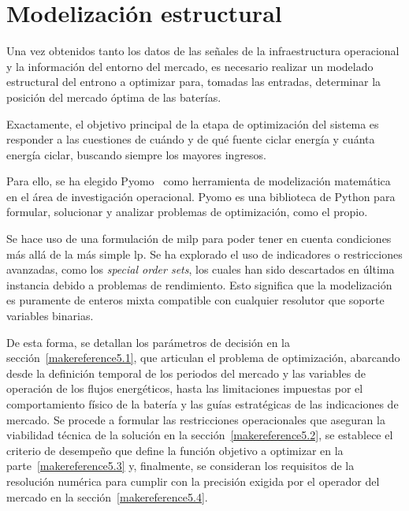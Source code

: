 
\cleardoublepage%

\chapter{Modelización estructural}%
\label{makereference5}

Una vez obtenidos tanto los datos de las señales de la infraestructura operacional y la información del entorno del mercado, es necesario realizar un modelado estructural del entrono a optimizar para, tomadas las entradas, determinar la posición del mercado óptima de las baterías.

Exactamente, el objetivo principal de la etapa de optimización del sistema es responder a las cuestiones de cuándo y de qué fuente ciclar energía y cuánta energía ciclar, buscando siempre los mayores ingresos.

Para ello, se ha elegido Pyomo~\cite{pyomo2025optimization} como herramienta de modelización matemática en el área de investigación operacional. Pyomo es una biblioteca de Python para formular, solucionar y analizar problemas de optimización, como el propio.

Se hace uso de una formulación de \gls{milp} para poder tener en cuenta condiciones más allá de la más simple \gls{lp}. Se ha explorado el uso de indicadores o restricciones avanzadas, como los \textit{special order sets}, los cuales han sido descartados en última instancia debido a problemas de rendimiento. Esto significa que la modelización es puramente de enteros mixta compatible con cualquier resolutor que soporte variables binarias.

De esta forma, se detallan los parámetros de decisión en la sección~\ref{makereference5.1}, que articulan el problema de optimización, abarcando desde la definición temporal de los periodos del mercado y las variables de operación de los flujos energéticos, hasta las limitaciones impuestas por el comportamiento físico de la batería y las guías estratégicas de las indicaciones de mercado. Se procede a formular las restricciones operacionales que aseguran la viabilidad técnica de la solución en la sección~\ref{makereference5.2}, se establece el criterio de desempeño que define la función objetivo a optimizar en la parte~\ref{makereference5.3} y, finalmente, se consideran los requisitos de la resolución numérica para cumplir con la precisión exigida por el operador del mercado en la sección~\ref{makereference5.4}.

